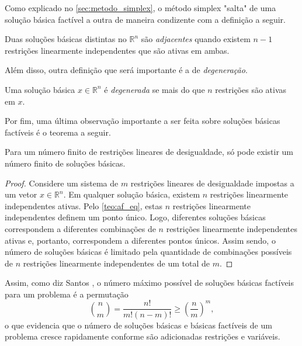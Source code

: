Como explicado no \cref{sec:metodo_simplex}, o método simplex "salta" de uma solução básica factível a outra de maneira condizente com a definição a seguir.

\begin{mydef}
    Duas soluções básicas distintas no $\mathbb{R}^n$ são \emph{adjacentes} quando existem $n - 1$ restrições linearmente independentes que são ativas em ambas.
\end{mydef}

Além disso, outra definição que será importante é a de \emph{degeneração}.

\begin{mydef}[Degeneração]\label{def:degeneração}
    Uma solução básica $x \in \mathbb{R}^n$ é \emph{degenerada} se mais do que $n$ restrições são ativas em $x$.
\end{mydef}

Por fim, uma última observação importante a ser feita sobre soluções básicas factíveis é o teorema a seguir.

\begin{theorem}\label{teo:SBFs finitas}
Para um número finito de restrições lineares de desigualdade, só pode existir um número finito de soluções básicas.
\end{theorem}
\begin{proof}
    Considere um sistema de $m$ restrições lineares de desigualdade impostas a um vetor $x \in \mathbb{R}^n$. Em qualquer solução básica, existem $n$ restrições linearmente independentes ativas. Pelo \cref{teo:af_eq}, estas $n$ restrições linearmente independentes definem um ponto único. Logo, diferentes soluções básicas correspondem a diferentes combinações de $n$ restrições linearmente independentes ativas e, portanto, correspondem a diferentes pontos únicos. Assim sendo, o número de soluções básicas é limitado pela quantidade de combinações possíveis de $n$ restrições linearmente independentes de um total de $m$.
\end{proof}

Assim, como diz Santos \cite{LRSANTOS:14}, o número máximo possível de soluções básicas factíveis para um problema é a permutação
\begin{equation}\label{eq:maxSBF}
    \binom{n}{m} = \frac{n!}{m!(n-m)!} \geq \left(\frac{n}{m}\right)^m,
\end{equation}
o que evidencia que o número de soluções básicas e básicas factíveis de um problema cresce rapidamente conforme são adicionadas restrições e variáveis.

